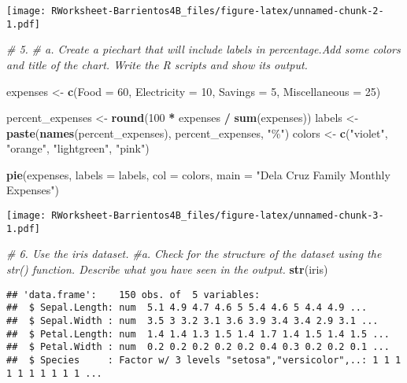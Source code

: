 \documentclass[
]{article}
\newenvironment{Shaded}{\begin{snugshade}}{\end{snugshade}}
\newcommand{\AttributeTok}[1]{\textcolor[rgb]{0.13,0.29,0.53}{#1}}
\newcommand{\CommentTok}[1]{\textcolor[rgb]{0.56,0.35,0.01}{\textit{#1}}}
\newcommand{\DecValTok}[1]{\textcolor[rgb]{0.00,0.00,0.81}{#1}}
\newcommand{\FunctionTok}[1]{\textcolor[rgb]{0.13,0.29,0.53}{\textbf{#1}}}
\newcommand{\NormalTok}[1]{#1}
\newcommand{\OtherTok}[1]{\textcolor[rgb]{0.56,0.35,0.01}{#1}}
\newcommand{\SpecialCharTok}[1]{\textcolor[rgb]{0.81,0.36,0.00}{\textbf{#1}}}
\newcommand{\StringTok}[1]{\textcolor[rgb]{0.31,0.60,0.02}{#1}}
\begin{document}
\texttt{[image: RWorksheet-Barrientos4B\_files/figure-latex/unnamed-chunk-2-1.pdf]}

\begin{Shaded}
\begin{Highlighting}[]
\CommentTok{\# 5. }
\CommentTok{\# a. Create a piechart that will include labels in percentage.Add some colors and title of the chart. Write the R scripts and show its output.}

\NormalTok{expenses }\OtherTok{\textless{}{-}} \FunctionTok{c}\NormalTok{(}\AttributeTok{Food =} \DecValTok{60}\NormalTok{, }\AttributeTok{Electricity =} \DecValTok{10}\NormalTok{, }\AttributeTok{Savings =} \DecValTok{5}\NormalTok{, }\AttributeTok{Miscellaneous =} \DecValTok{25}\NormalTok{)}

\NormalTok{percent\_expenses }\OtherTok{\textless{}{-}} \FunctionTok{round}\NormalTok{(}\DecValTok{100} \SpecialCharTok{*}\NormalTok{ expenses }\SpecialCharTok{/} \FunctionTok{sum}\NormalTok{(expenses))}
\NormalTok{labels }\OtherTok{\textless{}{-}} \FunctionTok{paste}\NormalTok{(}\FunctionTok{names}\NormalTok{(percent\_expenses), percent\_expenses, }\StringTok{"\%"}\NormalTok{)}
\NormalTok{colors }\OtherTok{\textless{}{-}} \FunctionTok{c}\NormalTok{(}\StringTok{"violet"}\NormalTok{, }\StringTok{"orange"}\NormalTok{, }\StringTok{"lightgreen"}\NormalTok{, }\StringTok{"pink"}\NormalTok{)}

\FunctionTok{pie}\NormalTok{(expenses, }\AttributeTok{labels =}\NormalTok{ labels, }\AttributeTok{col =}\NormalTok{ colors, }\AttributeTok{main =} \StringTok{"Dela Cruz Family Monthly Expenses"}\NormalTok{)}
\end{Highlighting}
\end{Shaded}

\texttt{[image: RWorksheet-Barrientos4B\_files/figure-latex/unnamed-chunk-3-1.pdf]}

\begin{Shaded}
\begin{Highlighting}[]
\CommentTok{\# 6. Use the iris dataset.}
\CommentTok{\#a. Check for the structure of the dataset using the str() function. Describe what you have seen in the output.}
\FunctionTok{str}\NormalTok{(iris)}
\end{Highlighting}
\end{Shaded}

\begin{verbatim}
## 'data.frame':    150 obs. of  5 variables:
##  $ Sepal.Length: num  5.1 4.9 4.7 4.6 5 5.4 4.6 5 4.4 4.9 ...
##  $ Sepal.Width : num  3.5 3 3.2 3.1 3.6 3.9 3.4 3.4 2.9 3.1 ...
##  $ Petal.Length: num  1.4 1.4 1.3 1.5 1.4 1.7 1.4 1.5 1.4 1.5 ...
##  $ Petal.Width : num  0.2 0.2 0.2 0.2 0.2 0.4 0.3 0.2 0.2 0.1 ...
##  $ Species     : Factor w/ 3 levels "setosa","versicolor",..: 1 1 1 1 1 1 1 1 1 1 ...
\end{verbatim}
\end{document}
